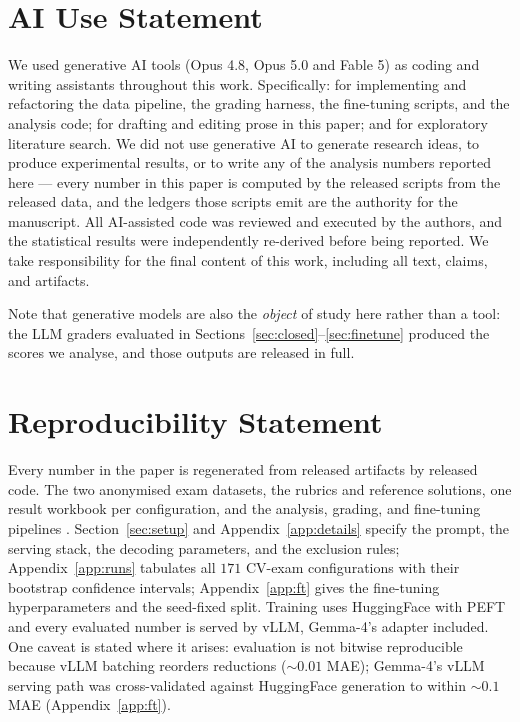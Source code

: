 
\section*{AI Use Statement}

We used generative AI tools (Opus 4.8, Opus 5.0 and Fable 5) as coding and writing assistants throughout this work. Specifically: for implementing and refactoring the data pipeline, the grading harness, the fine-tuning scripts, and the analysis code; for drafting and editing prose in this paper; and for exploratory literature search. We did not use generative AI to generate research ideas, to produce experimental results, or to write any of the analysis numbers reported here --- every number in this paper is computed by the released scripts from the released data, and the ledgers those scripts emit are the authority for the manuscript. All AI-assisted code was reviewed and executed by the authors, and the statistical results were independently re-derived before being reported. We take responsibility for the final content of this work, including all text, claims, and artifacts.

Note that generative models are also the \emph{object} of study here rather than a tool: the LLM graders evaluated in Sections~\ref{sec:closed}--\ref{sec:finetune} produced the scores we analyse, and those outputs are released in full.

\section*{Reproducibility Statement}

Every number in the paper is regenerated from released artifacts by released code. The two anonymised exam datasets, the rubrics and reference solutions, one result workbook per configuration, and the analysis, grading, and fine-tuning pipelines \artifactsshipin. Section~\ref{sec:setup} and Appendix~\ref{app:details} specify the prompt, the serving stack, the decoding parameters, and the exclusion rules; Appendix~\ref{app:runs} tabulates all $171$ CV-exam configurations with their bootstrap confidence intervals; Appendix~\ref{app:ft} gives the fine-tuning hyperparameters and the seed-fixed split. Training uses HuggingFace with PEFT and every evaluated number is served by vLLM, Gemma-4's adapter included. One caveat is stated where it arises: evaluation is not bitwise reproducible because vLLM batching reorders reductions ($\sim 0.01$ MAE); Gemma-4's vLLM serving path was cross-validated against HuggingFace generation to within $\sim 0.1$ MAE (Appendix~\ref{app:ft}).

